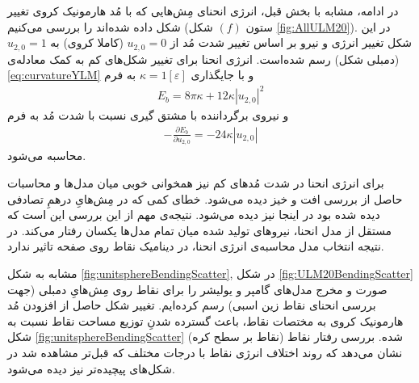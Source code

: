 در ادامه، مشابه با بخش قبل، انرژی انحنای مِش‌هایی که با مُد هارمونیک کروی تغییر شکل داده شده‌اند را بررسی می‌کنیم (ستون
$(f)$
شکل
\ref{fig:AllULM20}).
 در این شکل تغییر انرژی و نیرو بر اساس تغییر شدت مُد از
$u_{2,0}=0$
(کاملا کروی) به
$u_{2,0}=1$
(دمبلی شکل) رسم شده‌است. انرژی انحنا برای تغییر شکل‌های کم به کمک معادله‌ی 
\ref{eq:curvatureYLM}
 و با جایگذاری 
 $\kappa=1[\varepsilon]$
 به فرم
\begin{eqnarray}
E_{b}=8\pi\kappa + 12\kappa|u_{2,0}|^2
\label{eq:curvatureY20}
\end{eqnarray}
و نیروی برگرداننده با مشتق گیری نسبت با شدت مُد به فرم
\begin{eqnarray}
-\frac{\partial E_{b}}{\partial u_{2,0}}= -24\kappa |u_{2,0}|
\label{eq:curvatureForceY20}
\end{eqnarray}
محاسبه می‌شود.

برای انرژی انحنا در شد‌ت مُدهای کم نیز همخوانی خوبی میان مدل‌ها و محاسبات حاصل از بررسی افت و خیز دیده می‌شود. خطای کمی که در مِش‌هایِ درهمِ تصادفی دیده‌ شده بود در اینجا نیز دیده می‌شود.  نتیجه‌ی مهم از این بررسی این است که مستقل از مدل انحنا، نیروهای تولید شده میان تمام مدل‌ها یکسان رفتار می‌کند. در نتیجه انتخاب مدل محاسبه‌ی انرژی انحنا، در دینامیک نقاط روی صفحه تاثیر ندارد.




مشابه به شکل
\ref{fig:unitsphereBendingScatter},
در شکل 
\ref{fig:ULM20BendingScatter}
صورت و مخرج مدل‌های گامپر و یولیشر را برای نقاط روی مِش‌هایِ دمبلی (جهت بررسی انحنای نقاط زین اسبی) رسم کرده‌ایم. تغییر شکل حاصل از افزودن  مُد هارمونیک کروی به مختصات نقاط، باعث گسترده شدنِ توزیع مساحت نقاط نسبت به شکل 
\ref{fig:unitsphereBendingScatter}
(نقاط بر سطح کره) شده. بررسی رفتار نقاط نشان می‌دهد که روند اختلاف انرژی نقاط با درجات مختلف که قبل‌تر مشاهده شد در شکل‌های پیچیده‌تر نیز دیده می‌شود.





